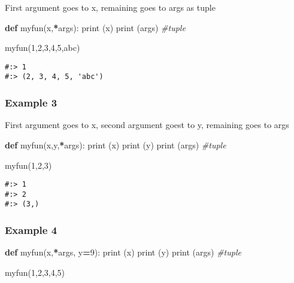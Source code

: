 \documentclass[
]{book}
\newenvironment{Shaded}{\begin{snugshade}}{\end{snugshade}}
\newcommand{\BuiltInTok}[1]{#1}
\newcommand{\CommentTok}[1]{\textcolor[rgb]{0.37,0.37,0.37}{\textit{#1}}}
\newcommand{\DecValTok}[1]{\textcolor[rgb]{0.06,0.06,0.06}{#1}}
\newcommand{\KeywordTok}[1]{\textcolor[rgb]{0.27,0.27,0.27}{\textbf{#1}}}
\newcommand{\NormalTok}[1]{#1}
\newcommand{\OperatorTok}[1]{\textcolor[rgb]{0.43,0.43,0.43}{\textbf{#1}}}
\newcommand{\StringTok}[1]{\textcolor[rgb]{0.5,0.5,0.5}{#1}}
\begin{document}
First argument goes to x, remaining goes to args as tuple

\begin{Shaded}
\begin{Highlighting}[]
\KeywordTok{def}\NormalTok{ myfun(x,}\OperatorTok{*}\NormalTok{args):}
    \BuiltInTok{print}\NormalTok{ (x)}
    \BuiltInTok{print}\NormalTok{ (args)     }\CommentTok{\#tuple}
    
\NormalTok{myfun(}\DecValTok{1}\NormalTok{,}\DecValTok{2}\NormalTok{,}\DecValTok{3}\NormalTok{,}\DecValTok{4}\NormalTok{,}\DecValTok{5}\NormalTok{,}\StringTok{\textquotesingle{}abc\textquotesingle{}}\NormalTok{)}
\end{Highlighting}
\end{Shaded}

\begin{verbatim}
#:> 1
#:> (2, 3, 4, 5, 'abc')
\end{verbatim}

\hypertarget{example-3}{%
\subsubsection{Example 3}\label{example-3}}

First argument goes to x, second argument goest to y, remaining goes to args

\begin{Shaded}
\begin{Highlighting}[]
\KeywordTok{def}\NormalTok{ myfun(x,y,}\OperatorTok{*}\NormalTok{args):}
    \BuiltInTok{print}\NormalTok{ (x)}
    \BuiltInTok{print}\NormalTok{ (y)}
    \BuiltInTok{print}\NormalTok{ (args)     }\CommentTok{\#tuple}
    
\NormalTok{myfun(}\DecValTok{1}\NormalTok{,}\DecValTok{2}\NormalTok{,}\DecValTok{3}\NormalTok{)}
\end{Highlighting}
\end{Shaded}

\begin{verbatim}
#:> 1
#:> 2
#:> (3,)
\end{verbatim}

\hypertarget{example-4}{%
\subsubsection{Example 4}\label{example-4}}

\begin{Shaded}
\begin{Highlighting}[]
\KeywordTok{def}\NormalTok{ myfun(x,}\OperatorTok{*}\NormalTok{args, y}\OperatorTok{=}\DecValTok{9}\NormalTok{):}
    \BuiltInTok{print}\NormalTok{ (x)}
    \BuiltInTok{print}\NormalTok{ (y)}
    \BuiltInTok{print}\NormalTok{ (args)     }\CommentTok{\#tuple}
    
\NormalTok{myfun(}\DecValTok{1}\NormalTok{,}\DecValTok{2}\NormalTok{,}\DecValTok{3}\NormalTok{,}\DecValTok{4}\NormalTok{,}\DecValTok{5}\NormalTok{)}
\end{Highlighting}
\end{Shaded}
\end{document}
